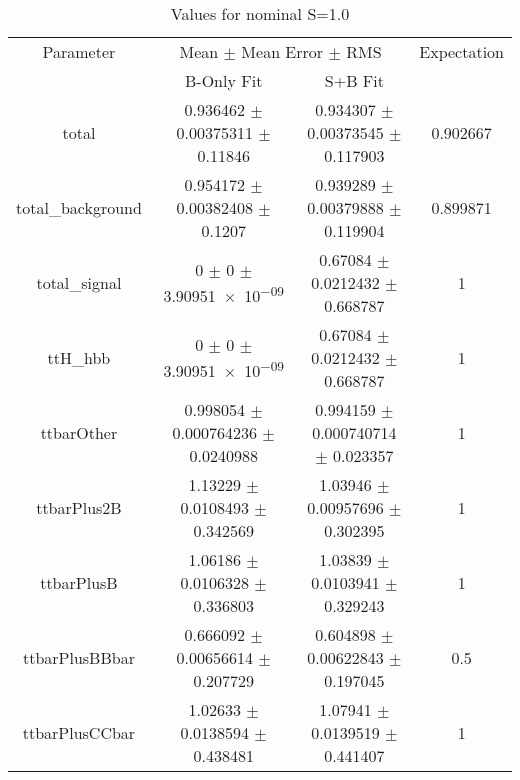 \begin{table}
\centering
\caption{Values for nominal S=1.0}
\begin{tabular}{cccc}
\toprule
Parameter & \multicolumn{2}{c}{Mean $\pm$ Mean Error $\pm$ RMS} & Expectation\\
 & B-Only Fit & S+B Fit & \\
\midrule
total & \num{0.936462} $\pm$ \num{0.00375311} $\pm$ \num{0.11846} & \num{0.934307} $\pm$ \num{0.00373545} $\pm$ \num{0.117903} & \num{0.902667}\\
total\_background & \num{0.954172} $\pm$ \num{0.00382408} $\pm$ \num{0.1207} & \num{0.939289} $\pm$ \num{0.00379888} $\pm$ \num{0.119904} & \num{0.899871}\\
total\_signal & \num{0} $\pm$ \num{0} $\pm$ \num{3.90951e-09} & \num{0.67084} $\pm$ \num{0.0212432} $\pm$ \num{0.668787} & \num{1}\\
ttH\_hbb & \num{0} $\pm$ \num{0} $\pm$ \num{3.90951e-09} & \num{0.67084} $\pm$ \num{0.0212432} $\pm$ \num{0.668787} & \num{1}\\
ttbarOther & \num{0.998054} $\pm$ \num{0.000764236} $\pm$ \num{0.0240988} & \num{0.994159} $\pm$ \num{0.000740714} $\pm$ \num{0.023357} & \num{1}\\
ttbarPlus2B & \num{1.13229} $\pm$ \num{0.0108493} $\pm$ \num{0.342569} & \num{1.03946} $\pm$ \num{0.00957696} $\pm$ \num{0.302395} & \num{1}\\
ttbarPlusB & \num{1.06186} $\pm$ \num{0.0106328} $\pm$ \num{0.336803} & \num{1.03839} $\pm$ \num{0.0103941} $\pm$ \num{0.329243} & \num{1}\\
ttbarPlusBBbar & \num{0.666092} $\pm$ \num{0.00656614} $\pm$ \num{0.207729} & \num{0.604898} $\pm$ \num{0.00622843} $\pm$ \num{0.197045} & \num{0.5}\\
ttbarPlusCCbar & \num{1.02633} $\pm$ \num{0.0138594} $\pm$ \num{0.438481} & \num{1.07941} $\pm$ \num{0.0139519} $\pm$ \num{0.441407} & \num{1}\\
\bottomrule
\end{tabular}
\end{table}